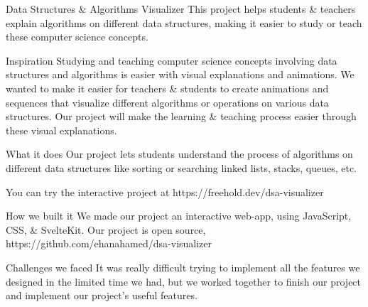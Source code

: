 Data Structures & Algorithms Visualizer
This project helps students & teachers explain algorithms on different data structures, making it easier to study or teach these computer science concepts.

Inspiration
Studying and teaching computer science concepts involving data structures and algorithms is easier with visual explanations and animations. We wanted to make it easier for teachers & students to create animations and sequences that visualize different algorithms or operations on various data structures. Our project will make the learning & teaching process easier through these visual explanations.

What it does
Our project lets students understand the process of algorithms on different data structures like sorting or searching linked lists, stacks, queues, etc.

You can try the interactive project at https://freehold.dev/dsa-visualizer

How we built it
We made our project an interactive web-app, using JavaScript, CSS, & SvelteKit. Our project is open source, https://github.com/ehanahamed/dsa-visualizer

Challenges we faced
It was really difficult trying to implement all the features we designed in the limited time we had, but we worked together to finish our project and implement our project's useful features.
